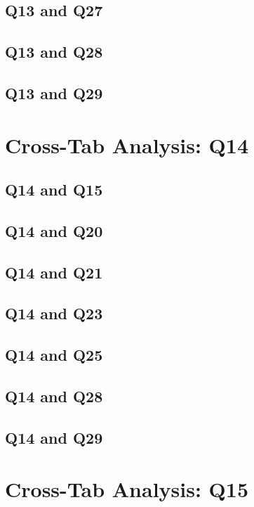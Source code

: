 \documentclass{report}
\begin{document}
\section{Q13 and Q27}\clearpage
\section{Q13 and Q28}\clearpage
\section{Q13 and Q29}\clearpage

\chapter{Cross-Tab Analysis: Q14}

\section{Q14 and Q15}\clearpage
\section{Q14 and Q20}\clearpage
\section{Q14 and Q21}\clearpage
\section{Q14 and Q23}\clearpage
\section{Q14 and Q25}\clearpage
\section{Q14 and Q28}\clearpage
\section{Q14 and Q29}\clearpage

\chapter{Cross-Tab Analysis: Q15}
\end{document}
